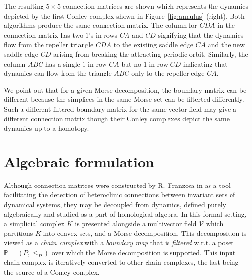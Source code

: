 \documentclass[a4paper,english,cleveref]{article}
\theoremstyle{plain}
\newcounter{li}
\newcommand{\mv}{\mathcal{V}}
\begin{document}
{The resulting
$5\times 5$ connection matrices are shown which represents the dynamics depicted by the
first Conley complex shown in Figure~\ref{fig:annulus} (right). Both algorithms produce
the same connection matrix.
The column for $CDA$ in the connection matrix
has two $1$'s in rows $CA$ and $CD$ signifying that the dynamics flow from the repeller triangle
$CDA$ to 
the existing saddle edge $CA$ and the new saddle edge $CD$ arising 
from breaking the attracting periodic orbit. 
Similarly, the column $ABC$ has a single $1$ in row $CA$ 
but no $1$ in row $CD$ indicating that dynamics 
can flow from the triangle $ABC$ only to the repeller edge $CA$.

We point out that for a given Morse decomposition, the boundary matrix
can be different because the simplices in the same Morse set can be filterted
differently. Such a different filtered boundary matrix for the same
vector field may give a different connection matrix though their Conley complexes
depict the same dynamics up to a homotopy. 
}



\section{Algebraic formulation}
\label{sec:prelim}

Although connection matrices were constructed by R.\ Franzosa in \cite{Fr1986,Fr1989}  
as a tool facilitating the detection of heteroclinic connections between invariant sets of dynamical systems,
they may be decoupled from dynamics, defined purely algebraically and studied as a part of homological algebra. In this formal setting, a simplicial complex $K$ is presented alongside a multivector field $\mv$ which partitions $K$ into convex sets, and a Morse decomposition. This decomposition is viewed as a 
\emph{chain complex} with a \emph{boundary map} that is \emph{filtered} w.r.t. a poset $\mathbb{P}=(P,\leq_P)$ over which the Morse decomposition is supported. This input
chain complex is iteratively converted to other chain complexes, the last
being the source of a Conley complex. 
\end{document}
